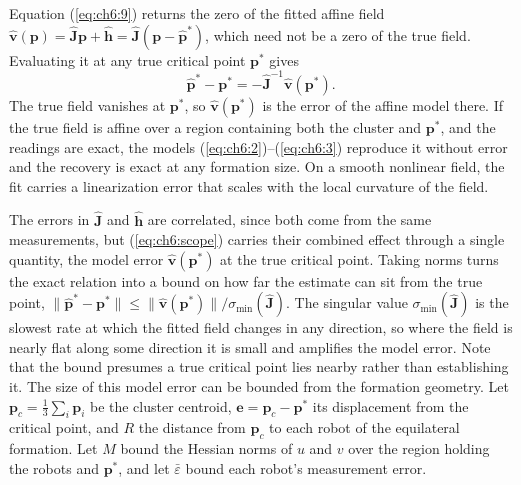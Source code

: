 Equation (\ref{eq:ch6:9}) returns the zero of the fitted affine field $\hat{\mathbf{v}}(\mathbf{p}) = \hat{\mathbf{J}}\mathbf{p} + \hat{\mathbf{h}} = \hat{\mathbf{J}}(\mathbf{p} - \hat{\mathbf{p}}^*)$, which need not be a zero of the true field. Evaluating it at any true critical point $\mathbf{p}^*$ gives
\begin{equation}\label{eq:ch6:scope}
\hat{\mathbf{p}}^* - \mathbf{p}^* = -\hat{\mathbf{J}}^{-1}\hat{\mathbf{v}}(\mathbf{p}^*).
\end{equation}
The true field vanishes at $\mathbf{p}^*$, so $\hat{\mathbf{v}}(\mathbf{p}^*)$ is the error of the affine model there. If the true field is affine over a region containing both the cluster and $\mathbf{p}^*$, and the readings are exact, the models (\ref{eq:ch6:2})--(\ref{eq:ch6:3}) reproduce it without error and the recovery is exact at any formation size. On a smooth nonlinear field, the fit carries a linearization error that scales with the local curvature of the field.

The errors in $\hat{\mathbf{J}}$ and $\hat{\mathbf{h}}$ are correlated, since both come from the same measurements, but (\ref{eq:ch6:scope}) carries their combined effect through a single quantity, the model error $\hat{\mathbf{v}}(\mathbf{p}^*)$ at the true critical point. Taking norms turns the exact relation into a bound on how far the estimate can sit from the true point, $\|\hat{\mathbf{p}}^* - \mathbf{p}^*\| \le \|\hat{\mathbf{v}}(\mathbf{p}^*)\|/\sigma_{\min}(\hat{\mathbf{J}})$. The singular value $\sigma_{\min}(\hat{\mathbf{J}})$ is the slowest rate at which the fitted field changes in any direction, so where the field is nearly flat along some direction it is small and amplifies the model error. Note that the bound presumes a true critical point lies nearby rather than establishing it.
The size of this model error can be bounded from the formation geometry. Let $\mathbf{p}_c = \frac{1}{3}\sum_i\mathbf{p}_i$ be the cluster centroid, $\mathbf{e} = \mathbf{p}_c - \mathbf{p}^*$ its displacement from the critical point, and $R$ the distance from $\mathbf{p}_c$ to each robot of the equilateral formation. Let $M$ bound the Hessian norms of $u$ and $v$ over the region holding the robots and $\mathbf{p}^*$, and let $\bar{\varepsilon}$ bound each robot's measurement error.

